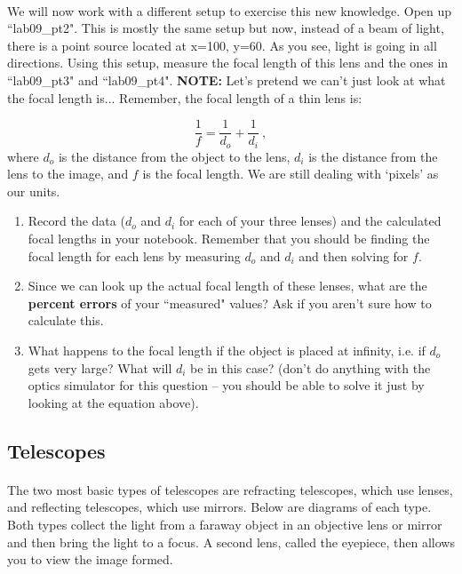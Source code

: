 \documentclass[12pt]{article}%
\begin{document}
\paragraph{}
We will now work with a different setup to exercise this new knowledge. Open up ``lab09\_pt2". This is mostly the same setup but now, instead of a beam of light, there is a point source located at x=100, y=60. As you see, light is going in all directions. Using this setup, measure the focal length of this lens and the ones in ``lab09\_pt3" and ``lab09\_pt4". \textbf{NOTE:} Let's pretend we can't just look at what the focal length is... Remember, the focal length of a thin lens is:
 
\begin{equation}
\frac{1}{f} = \frac{1}{d_o}+\frac{1}{d_i} \ ,
\end{equation}
where $d_o$ is the distance from the object to the lens, $d_i$ is the distance from the lens to the image, and $f$ is the focal length. We are still dealing with `pixels' as our units.
 
\begin{enumerate}
           \item Record the data ($d_o$ and $d_i$ for each of your three lenses) and the calculated focal lengths in your notebook. Remember that you should be finding the focal length for each lens by measuring $d_o$ and $d_i$ and then solving for $f$.
           \item Since we can look up the actual focal length of these lenses, what are the \textbf{percent errors} of your ``measured" values? Ask if you aren't sure how to calculate this.
           \item What happens to the focal length if the object is placed at infinity, i.e. if $d_o$ gets very large? What will $d_i$ be in this case? (don't do anything with the optics simulator for this question -- you should be able to solve it just by looking at the equation above).
\end{enumerate}
 
\subsection{Telescopes}
 
\paragraph{}
The two most basic types of telescopes are refracting telescopes, which use lenses, and reflecting telescopes, which use mirrors. Below are diagrams of each type. Both types collect the light from a faraway object in an objective lens or mirror and then bring the light to a focus. A second lens, called the eyepiece, then allows you to view the image formed.
 
\end{document}
